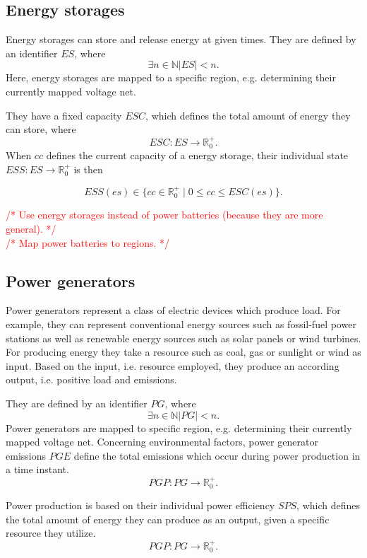 \documentclass[conference]{IEEEtran}
\newcommand{\todo}[1]{\textcolor{red}{/* #1 */}}
\begin{document}
	\subsection{Energy storages}
	\label{energy_storages}
	Energy storages can store and release energy at given times.
	They are defined by an identifier $ES$, where 
	\[
	\exists n \in \mathbb{N} |ES| < n \mathrm{.}
	\]
	Here, energy storages are mapped to a specific region, e.g. determining their currently mapped voltage net.
	
	They have a fixed capacity $ESC$, which defines the total amount of energy they can store, where
	\[	
	ESC : ES \rightarrow \mathbb{R}_0^+ \mathrm{.}
	\]
	When $cc$ defines the current capacity of a energy storage, their individual state $ESS : ES \rightarrow \mathbb{R}_0^+$ is then
	
	\[
	ESS(es) \in \{cc \in \mathbb{R}_0^+ \mid 0 \leq cc \leq ESC(es)\} \mathrm{.}
	\]
	
	\todo{Use energy storages instead of power batteries (because they are more general).}
	\\
	\todo{Map power batteries to regions.}
	
	\subsection{Power generators}
	\label{power_generators}
	
	Power generators represent a class of electric devices which produce load. For example, they can represent conventional energy sources such as fossil-fuel power stations as well as renewable energy sources such as solar panels or wind turbines. For producing energy they take a resource such as coal, gas or sunlight or wind as input. Based on the input, i.e. resource employed, they produce an according output, i.e. positive load and emissions. 
	
	They are defined by an identifier $PG$, where 
	\[
	\exists n \in \mathbb{N} |PG| < n \mathrm{.}
	\]
	Power generators are mapped to specific region, e.g. determining their currently mapped voltage net.
	Concerning environmental factors, power generator emissions $PGE$ define the total emissions which occur during power production in a time instant.
	\[
	PGP : PG \rightarrow \mathbb{R}_0^+ \mathrm{.}
	\]
	
	Power production is based on their individual power efficiency $SPS$, which defines the total amount of energy they can produce as an output, given a specific resource they utilize.
	\[	
	PGP : PG \rightarrow \mathbb{R}_0^+ \mathrm{.}
	\]
%	
%	
	
\end{document}
